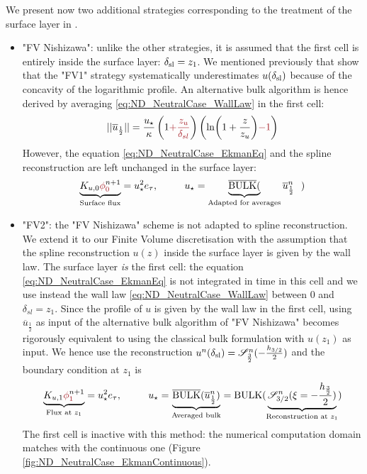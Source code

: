 We present now two additional strategies corresponding to
the treatment of the surface layer in \citep{nishizawa_surface_2018}.
\begin{itemize}
    \item "FV Nishizawa":  unlike the other strategies,
	    it is assumed that the first cell is entirely inside
		the surface layer: $\delta_{\rm sl} = z_{1}$.
		We mentioned previously that
		\cite{nishizawa_surface_2018} show that the "FV1"
		strategy systematically underestimates
		$u(\delta_{\rm sl})$ because of the
	  concavity of the logarithmic profile.
	  An alternative bulk algorithm is hence derived by averaging
		\eqref{eq:ND_NeutralCase_WallLaw} in the first cell:
	\begin{equation}
		||\overline{u}_{\frac{1}{2}}||
		= \frac{u_\star}{\kappa}
		\left(1\emphase{+\frac{z_u}{\delta_{sl}}}\right)
		\left(\ln(1+\frac{z}{z_u})\emphase{-1}\right)
	\end{equation}
	However, the equation \eqref{eq:ND_NeutralCase_EkmanEq}
	and the spline reconstruction are left unchanged in the
	surface layer:
		  \begin{equation}
		\underbrace{K_{u,0} \emphase{\phi}^{n+1}_\emphase{0}}_{\text{Surface flux}}
		= u_\star^2 e_\tau, ~~~~~~~~
			  u_\star = \underbrace{\overline{{\rm BULK}}(}_{
				  \text{Adapted for averages}}
			  \overline{u}^{n}_{\frac{1}{2}}~~)
		  \end{equation}
	\item "FV2": the "FV Nishizawa" scheme is not adapted to
		spline reconstruction. We extend it to our
		Finite Volume discretisation with the assumption
		that the spline reconstruction $u(z)$ inside
		the surface layer is given by the wall law.
	    The surface layer \textit{is} the first cell:
	    the equation \eqref{eq:ND_NeutralCase_EkmanEq}
	    is not integrated in time in this cell
	and we use instead the wall law
	\eqref{eq:ND_NeutralCase_WallLaw} between 0 and
		$\delta_{sl} = z_1$.
	Since the profile of $u$ is given by the wall law
	in the first cell,
	using $\overline{u}_{\frac{1}{2}}$ as input of
	the alternative bulk algorithm of "FV Nishizawa"
	becomes rigorously equivalent to using the
	classical bulk formulation with $u(z_1)$
	as input.
	We hence use the reconstruction
	$u^n(\delta_{\rm sl}) = {\cal S}^n_{\frac{3}{2}}(
	  -\frac{h_{3/2}}{2})$ and the boundary condition
		  at $z_1$ is
	  \begin{equation}
		\underbrace{K_{u,1} \emphase{\phi}^{n+1}_\emphase{1}}_{\text{Flux at } z_1}
		= u_\star^2 e_\tau, ~~~~~~~~
			  u_\star = \underbrace{\overline{{\rm BULK}}(
			  \overline{u}^{n}_{\frac{1}{2}})}_{
				  \text{Averaged bulk}
			  } = {\rm BULK}(
			\underbrace{{\cal S}_{3/2}^{n}
			(\xi=-\frac{h_{\frac{3}{2}}}{2})}_{
				\text{Reconstruction at }
			z_{1}})
		  \end{equation}
	The first cell is inactive with this method:
	the numerical computation domain matches with the continuous
	one (Figure \ref{fig:ND_NeutralCase_EkmanContinuous}).
  \end{itemize}
